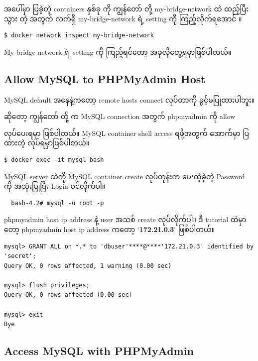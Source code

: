 \documentclass[]{article}
\begin{document}
အပေါ်မှာ ပြခဲ့တဲ့ containers နှစ်ခု ကို ကျွန်တော် တို့ my-bridge-network
ထဲ ထည့်ပြီးသွား တဲ့ အတွက် လက်ရှိ my-bridge-network ရဲ့ setting ကို
ကြည့်လိုက်ရအောင် ။

\begin{verbatim}
$ docker network inspect my-bridge-network
\end{verbatim}

My-bridge-network ရဲ့ setting ကို ကြည့်ရင်တော့ အခုလိုတွေ့ရမှာဖြစ်ပါတယ်။

\hypertarget{allow-mysql-to-phpmyadmin-host}{%
\subsection{Allow MySQL to PHPMyAdmin
Host}\label{allow-mysql-to-phpmyadmin-host}}

MySQL default အနေနဲ့ကတော့ remote hosts connect လုပ်တာကို
ခွင့်မပြုထားပါဘူး။

ဆိုတော့ ကျွန်တော် တို့ က MySQL connection အတွက် phpmyadmin ကို allow

လုပ်ပေးရမှာ ဖြစ်ပါတယ်။ MySQL container shell access ရဖို့အတွက် အောက်မှာ
ပြထားတဲ့ လုပ်ရမှာဖြစ်ပါတယ်။

\begin{verbatim}
$ docker exec -it mysql bash
\end{verbatim}

MySQL server ထဲကို MySQL container create လုပ်တုန်းက ပေးထဲ့ခဲ့တဲ့
Password ကို အသုံးပြုပြီး Login ဝင်လိုက်ပါ။

\begin{verbatim}
  bash-4.2# mysql -u root -p
\end{verbatim}

phpmyadmin host ip address နဲ့ user အသစ် create လုပ်လိုက်ပါ။ ဒီ tutorial
ထဲမှာတော့ phpmyadmin host ip address ကတော့ `\textbf{172.21.0.3}`
ဖြစ်ပါတယ်။

\begin{verbatim}
mysql> GRANT ALL on *.* to 'dbuser'****@****'172.21.0.3' identified by 'secret';
Query OK, 0 rows affected, 1 warning (0.00 sec)

mysql> flush privileges;
Query OK, 0 rows affected (0.00 sec)

mysql> exit
Bye
\end{verbatim}

\hypertarget{access-mysql-with-phpmyadmin}{%
\subsection{Access MySQL with
PHPMyAdmin}\label{access-mysql-with-phpmyadmin}}
\end{document}
